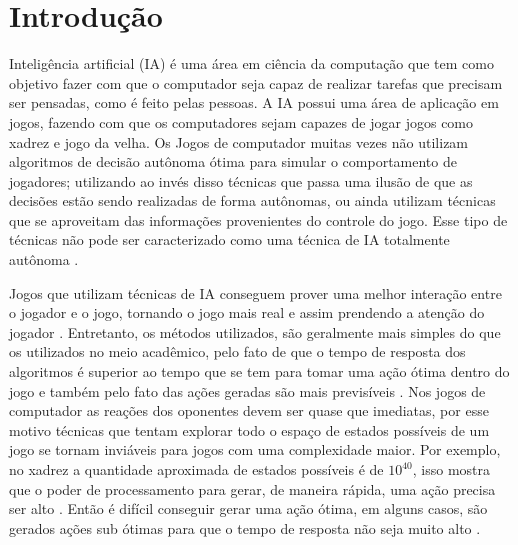\chapter{\label{chap:intro}Introdução}

Inteligência artificial (IA) é uma área em ciência da computação que tem como objetivo fazer com que o computador seja capaz de realizar tarefas que precisam ser pensadas, como é feito pelas pessoas. A IA possui uma área de aplicação em jogos, fazendo com que os computadores sejam capazes de jogar jogos como xadrez e jogo da velha. 
Os Jogos de computador muitas vezes não utilizam algoritmos de decisão autônoma ótima para simular o comportamento de jogadores; utilizando ao invés disso técnicas que passa uma ilusão de que as decisões estão sendo realizadas de forma autônomas, ou ainda utilizam técnicas que se aproveitam das informações provenientes do controle do jogo. Esse tipo de técnicas não pode ser caracterizado como uma técnica de IA totalmente autônoma \cite{millington2009artificial}.  

Jogos que utilizam técnicas de IA conseguem prover uma melhor interação entre o jogador e o jogo, tornando o jogo mais real e assim prendendo a atenção do jogador \cite{millington2009artificial}. 
Entretanto, os métodos utilizados, são geralmente mais simples do que os utilizados no meio acadêmico, pelo fato de que o tempo de resposta dos algoritmos é superior ao tempo que se tem para tomar uma ação ótima dentro do jogo e também pelo fato das ações geradas são mais previsíveis \cite{intelligence2003modern}.
Nos jogos de computador as reações dos oponentes devem ser quase que imediatas, por esse motivo técnicas que tentam explorar todo o espaço de estados possíveis de um jogo se tornam inviáveis para jogos com uma complexidade maior.
Por exemplo, no xadrez a quantidade aproximada de estados possíveis é de $10^{40}$, isso mostra que o poder de processamento para gerar, de maneira rápida, uma ação precisa ser alto \cite{millington2009artificial}. 
Então é difícil conseguir gerar uma ação ótima, em alguns casos, são gerados ações sub ótimas para que o tempo de resposta não seja muito alto \cite{intelligence2003modern}. 

